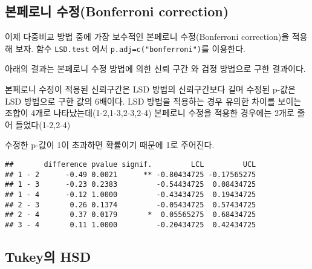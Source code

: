 \documentclass[
]{book}
\newenvironment{Shaded}{\begin{snugshade}}{\end{snugshade}}
\newcommand{\AttributeTok}[1]{\textcolor[rgb]{0.77,0.63,0.00}{#1}}
\newcommand{\ConstantTok}[1]{\textcolor[rgb]{0.00,0.00,0.00}{#1}}
\newcommand{\FloatTok}[1]{\textcolor[rgb]{0.00,0.00,0.81}{#1}}
\newcommand{\FunctionTok}[1]{\textcolor[rgb]{0.00,0.00,0.00}{#1}}
\newcommand{\NormalTok}[1]{#1}
\newcommand{\OtherTok}[1]{\textcolor[rgb]{0.56,0.35,0.01}{#1}}
\newcommand{\SpecialCharTok}[1]{\textcolor[rgb]{0.00,0.00,0.00}{#1}}
\newcommand{\StringTok}[1]{\textcolor[rgb]{0.31,0.60,0.02}{#1}}
\begin{document}
\hypertarget{uxbcf8uxd398uxb85cuxb2c8-uxc218uxc815bonferroni-correction}{%
\subsection{본페로니 수정(Bonferroni correction)}\label{uxbcf8uxd398uxb85cuxb2c8-uxc218uxc815bonferroni-correction}}

이제 다중비교 방법 중에 가장 보수적인 본페로니 수정(Bonferroni
correction)을 적용해 보자. 함수 \texttt{LSD.test} 에서
\texttt{p.adj=c("bonferroni")}를 이용한다.

아래의 결과는 본페로니 수정 방법에 의한 신뢰 구간
와 검정 방법으로 구한 결과이다.

본페로니 수정이 적용된 신뢰구간은 LSD 방법의
신뢰구간보다 길며 수정된 p-값은 LSD 방법으로 구한 값의 6배이다. LSD 방법을
적용하는 경우 유의한 차이를 보이는 조합이 4개로
나타났는데(1-2,1-3,2-3,2-4) 본페로니 수정을 적용한 경우에는 2개로 줄어
들었다(1-2,2-4)

수정한 p-값이 1이 초과하면 확률이기 때문에 1로 주어진다.

\begin{Shaded}
\end{Shaded}

\begin{verbatim}
##       difference pvalue signif.         LCL         UCL
## 1 - 2      -0.49 0.0021      ** -0.80434725 -0.17565275
## 1 - 3      -0.23 0.2383         -0.54434725  0.08434725
## 1 - 4      -0.12 1.0000         -0.43434725  0.19434725
## 2 - 3       0.26 0.1374         -0.05434725  0.57434725
## 2 - 4       0.37 0.0179       *  0.05565275  0.68434725
## 3 - 4       0.11 1.0000         -0.20434725  0.42434725
\end{verbatim}

\hypertarget{tukeyuxc758-hsd}{%
\subsection{Tukey의 HSD}\label{tukeyuxc758-hsd}}
\end{document}
